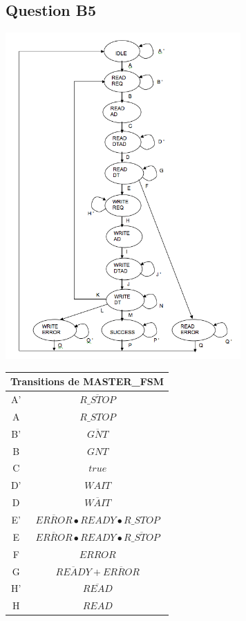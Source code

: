 \documentclass[10pt]{article}
\begin{document}
\subsection{Question B5}
\begin{center}
  \includegraphics[width=9cm]{tp7_master_fsm.png}
  \begin{tabular}{|c|c|}
    \hline
    \multicolumn{2}{|c|}{Transitions de MASTER\_FSM} \\ \hline
    A'  & $\overline{R\_STOP}$ \\ \hline
    A   & $R\_STOP$ \\ \hline
    B'  & $\overline{GNT}$ \\ \hline
    B   & $GNT$ \\ \hline
    C   & $true$ \\ \hline
    D'  & $WAIT$ \\ \hline
    D   & $\overline{WAIT}$ \\ \hline
    E'\footnote[1] & $\overline{ERROR}\bullet{READY}\bullet{R\_STOP}$ \\ \hline
    E   & $\overline{ERROR}\bullet{READY}\bullet\overline{R\_STOP}$ \\ \hline
    F   & $ERROR$ \\ \hline
    G   & $\overline{READY}+\overline{ERROR}$ \\ \hline
    H'  & $\overline{READ}$ \\ \hline
    H   & $READ$ \\ \hline

\end{tabular}
\end{center}
\end{document}
